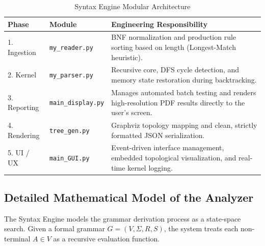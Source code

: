 \documentclass[12pt,a4paper]{article}
\begin{document}
    \begin{table}[h!]
        \centering
        \caption{Syntax Engine Modular Architecture}
        \label{tab:architecture}
        \renewcommand{\arraystretch}{1.3}
        \begin{tabular}{@{}p{3cm} p{3.5cm} p{8cm}@{}}
            \toprule
            \textbf{Phase} & \textbf{Module} & \textbf{Engineering Responsibility} \\
            \midrule
            1. Ingestion & \texttt{my\_reader.py} & BNF normalization and production rule sorting based on length (Longest-Match heuristic). \\
            2. Kernel & \texttt{my\_parser.py} & Recursive core, DFS cycle detection, and memory state restoration during backtracking. \\
            3. Reporting & \texttt{main\_display.py} & Manages automated batch testing and renders high-resolution PDF results directly to the user's screen. \\
            4. Rendering & \texttt{tree\_gen.py} & Graphviz topology mapping and clean, strictly formatted JSON serialization. \\
            5. UI / UX & \texttt{main\_GUI.py} & Event-driven interface management, embedded topological visualization, and real-time kernel logging. \\
            \bottomrule
        \end{tabular}
    \end{table}

    \subsection{Detailed Mathematical Model of the Analyzer}
    The Syntax Engine models the grammar derivation process as a state-space search. Given a formal grammar $G = (V, \Sigma, R, S)$, the system treats each non-terminal $A \in V$ as a recursive evaluation function.
\end{document}
